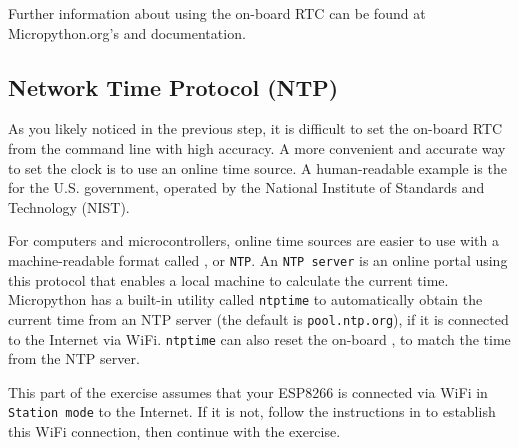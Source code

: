 Further information about using the on-board RTC can be found at Micropython.org's  and
 documentation.

\subsection{Network Time Protocol (NTP)}
As you likely noticed in the previous step, it is difficult to set the on-board RTC from the command line with high accuracy. 
A more convenient and accurate way to set the clock is to use an online time source.
A human-readable example is the  for the U.S. government, operated by the National Institute of Standards and Technology (NIST).

For computers and microcontrollers, online time sources are easier to use with a machine-readable format called  
, or \texttt{NTP}. 
An \texttt{NTP server} is an online portal using this protocol that enables a local machine to calculate the current time.  
Micropython has a built-in utility called \lstinline{ntptime} to automatically obtain the current time from an NTP server (the default is \texttt{pool.ntp.org}), if it is connected to the Internet via WiFi. 
\lstinline{ntptime} can also reset the on-board \rtc, to match the time from the NTP server. 

	This part of the exercise assumes that your ESP8266 is connected via WiFi in \texttt{Station mode} to the Internet. If it is not, follow the instructions in  to establish this WiFi connection, then continue with the exercise.

